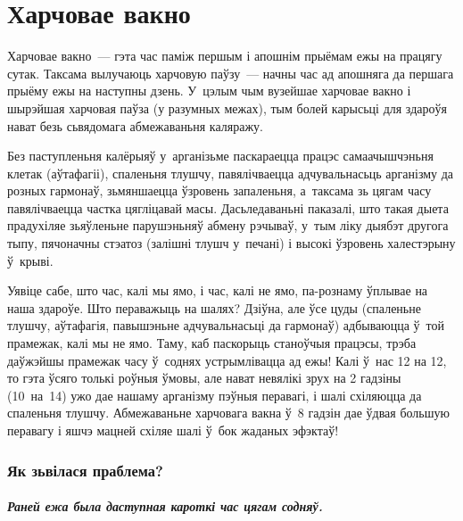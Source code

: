 \chapter{Харчовае вакно}

Харчовае вакно~--- гэта час паміж першым і апошнім прыёмам ежы на працягу сутак. Таксама вылучаюць харчовую паўзу~--- начны час ад апошняга да першага прыёму ежы на наступны дзень. У~цэлым чым вузейшае харчовае вакно і шырэйшая харчовая паўза (у разумных межах), тым болей карысьці для здароўя нават безь сьвядомага абмежаваньня каляражу. 

Без паступленьня калёрыяў у~арганізьме паскараецца працэс самаачышчэньня клетак (аўтафагіі), спаленьня тлушчу, павялічваецца адчувальнасьць арганізму да розных гармонаў, зьмяншаецца ўзровень запаленьня, а~таксама зь цягам часу павялічваецца частка цягліцавай масы. Дасьледаваньні паказалі, што такая дыета прадухіляе зьяўленьне парушэньняў абмену рэчываў, у~тым ліку дыябэт другога тыпу, пячоначны стэатоз (залішні тлушч у~печані) і высокі ўзровень халестэрыну ў~крыві.


Уявіце сабе, што час, калі мы ямо, і час, калі не ямо, па-рознаму ўплывае на наша здароўе. Што пераважыць на шалях? Дзіўна, але ўсе цуды (спаленьне тлушчу, аўтафагія, павышэньне адчувальнасьці да гармонаў) адбываюцца ў~той прамежак, калі мы не ямо. Таму, каб паскорыць станоўчыя працэсы, трэба даўжэйшы прамежак часу ў~соднях устрымлівацца ад ежы! Калі ў~нас 12 на 12, то гэта ўсяго толькі роўныя ўмовы, але нават невялікі зрух на 2 гадзіны (10~на~14) ужо дае нашаму арганізму пэўныя перавагі, і шалі схіляюцца да спаленьня тлушчу. Абмежаваньне харчовага вакна ў~8 гадзін дае ўдвая большую перавагу і яшчэ мацней схіляе шалі ў~бок жаданых эфэктаў!

\subsection{Як зьвілася праблема?}

\paragraph{Раней ежа была даступная кароткі час цягам содняў.}

